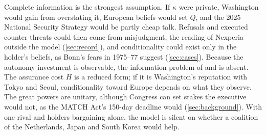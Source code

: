 Complete information is the strongest assumption. If $\kappa$ were private, Washington would gain from overstating it, European beliefs would set $Q$, and the 2025 National Security Strategy would be partly cheap talk. Refusals and executed counter-threats could then come from misjudgment, the reading of Nexperia outside the model (\cref{sec:record}), and conditionality could exist only in the holder's beliefs, as Bonn's fears in 1975--77 suggest (\cref{sec:cases}). Because the autonomy investment is observable, the information problem of \citet{debs2014known} and \citet{bas2016dynamic} is absent. The assurance cost $H$ is a reduced form; if it is Washington's reputation with Tokyo and Seoul, conditionality toward Europe depends on what they observe. The great powers are unitary, although Congress can set stakes the executive would not, as the MATCH Act's 150-day deadline would (\cref{sec:background}). With one rival and holders bargaining alone, the model is silent on whether a coalition of the Netherlands, Japan and South Korea would help.
